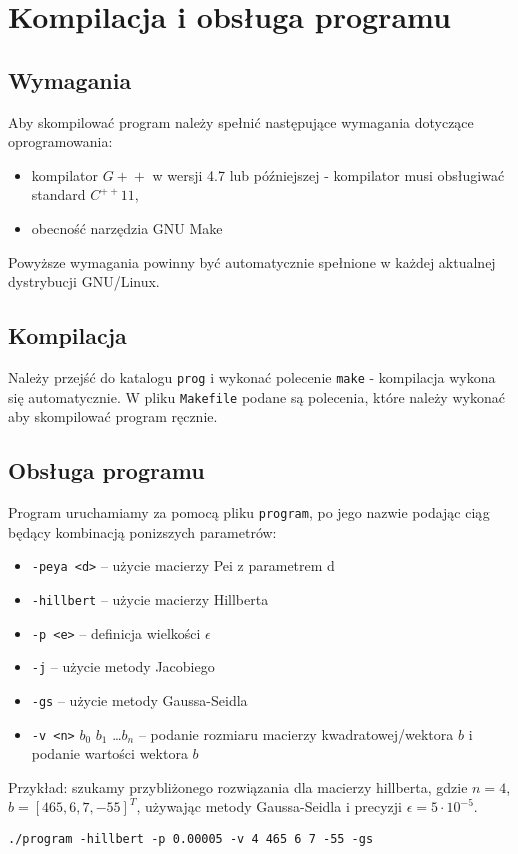 \documentclass[a4paper,11pt]{article}
\begin{document}
    

\section{Kompilacja i obsługa programu}
    \subsection{Wymagania}
    Aby skompilować program należy spełnić następujące wymagania dotyczące oprogramowania:
    \begin{itemize}
      \item kompilator $ G\!+\!+ $ w wersji 4.7 lub późniejszej - kompilator musi obsługiwać standard $ C^{++}11 $,
      \item obecność narzędzia GNU Make
    \end{itemize}
    Powyższe wymagania powinny być automatycznie spełnione w każdej aktualnej dystrybucji GNU/Linux.
    
    \subsection{Kompilacja}
    Należy przejść do katalogu \texttt{prog} i wykonać polecenie \texttt{make} - kompilacja wykona się automatycznie. W pliku \texttt{Makefile} podane są polecenia, które należy wykonać aby skompilować program ręcznie.
    
    \subsection{Obsługa programu}
    Program uruchamiamy za pomocą pliku \texttt{program}, po jego nazwie podając ciąg będący kombinacją ponizszych parametrów:
    \begin{itemize}
      \item \texttt{-peya <d>} -- użycie macierzy Pei z parametrem d
      \item \texttt{-hillbert} -- użycie macierzy Hillberta
      \item \texttt{-p <e>} -- definicja wielkości $\epsilon$
      \item \texttt{-j} -- użycie metody Jacobiego
      \item \texttt{-gs} -- użycie metody Gaussa-Seidla
      \item \texttt{-v <n>} $b_0$ $b_1$ \dots $b_n$ -- podanie rozmiaru macierzy kwadratowej/wektora $b$ i podanie wartości wektora $b$
      
    \end{itemize}
    
    Przykład: szukamy przybliżonego rozwiązania dla macierzy hillberta, gdzie $ n = 4 $, $ b = [465, 6, 7, -55]^T $, używając metody Gaussa-Seidla i precyzji $ \epsilon = 5 \cdot 10^{-5} $.
    \begin{center}
      \texttt{./program -hillbert -p 0.00005 -v 4 465 6 7 -55 -gs}
    \end{center}

 
\end{document}
